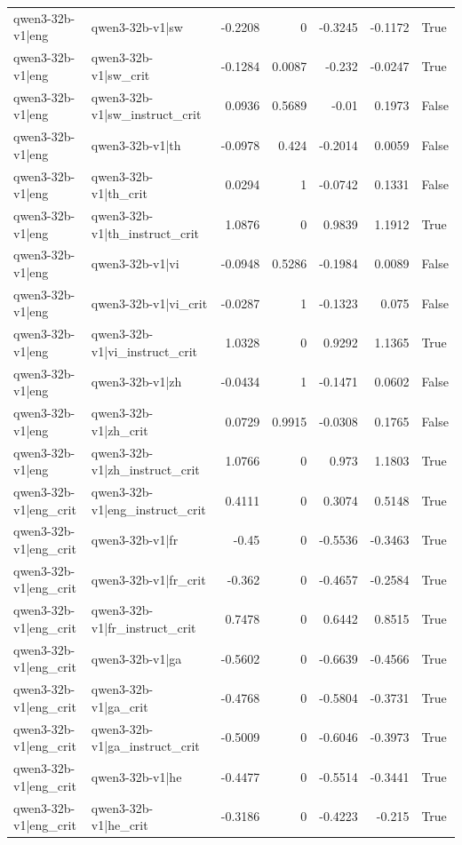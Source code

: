 \begin{table}
\begin{tabular}{l l r r r r l}
qwen3-32b-v1|eng & qwen3-32b-v1|sw & -0.2208 & 0 & -0.3245 & -0.1172 & True \\
qwen3-32b-v1|eng & qwen3-32b-v1|sw_crit & -0.1284 & 0.0087 & -0.232 & -0.0247 & True \\
qwen3-32b-v1|eng & qwen3-32b-v1|sw_instruct_crit & 0.0936 & 0.5689 & -0.01 & 0.1973 & False \\
qwen3-32b-v1|eng & qwen3-32b-v1|th & -0.0978 & 0.424 & -0.2014 & 0.0059 & False \\
qwen3-32b-v1|eng & qwen3-32b-v1|th_crit & 0.0294 & 1 & -0.0742 & 0.1331 & False \\
qwen3-32b-v1|eng & qwen3-32b-v1|th_instruct_crit & 1.0876 & 0 & 0.9839 & 1.1912 & True \\
qwen3-32b-v1|eng & qwen3-32b-v1|vi & -0.0948 & 0.5286 & -0.1984 & 0.0089 & False \\
qwen3-32b-v1|eng & qwen3-32b-v1|vi_crit & -0.0287 & 1 & -0.1323 & 0.075 & False \\
qwen3-32b-v1|eng & qwen3-32b-v1|vi_instruct_crit & 1.0328 & 0 & 0.9292 & 1.1365 & True \\
qwen3-32b-v1|eng & qwen3-32b-v1|zh & -0.0434 & 1 & -0.1471 & 0.0602 & False \\
qwen3-32b-v1|eng & qwen3-32b-v1|zh_crit & 0.0729 & 0.9915 & -0.0308 & 0.1765 & False \\
qwen3-32b-v1|eng & qwen3-32b-v1|zh_instruct_crit & 1.0766 & 0 & 0.973 & 1.1803 & True \\
qwen3-32b-v1|eng_crit & qwen3-32b-v1|eng_instruct_crit & 0.4111 & 0 & 0.3074 & 0.5148 & True \\
qwen3-32b-v1|eng_crit & qwen3-32b-v1|fr & -0.45 & 0 & -0.5536 & -0.3463 & True \\
qwen3-32b-v1|eng_crit & qwen3-32b-v1|fr_crit & -0.362 & 0 & -0.4657 & -0.2584 & True \\
qwen3-32b-v1|eng_crit & qwen3-32b-v1|fr_instruct_crit & 0.7478 & 0 & 0.6442 & 0.8515 & True \\
qwen3-32b-v1|eng_crit & qwen3-32b-v1|ga & -0.5602 & 0 & -0.6639 & -0.4566 & True \\
qwen3-32b-v1|eng_crit & qwen3-32b-v1|ga_crit & -0.4768 & 0 & -0.5804 & -0.3731 & True \\
qwen3-32b-v1|eng_crit & qwen3-32b-v1|ga_instruct_crit & -0.5009 & 0 & -0.6046 & -0.3973 & True \\
qwen3-32b-v1|eng_crit & qwen3-32b-v1|he & -0.4477 & 0 & -0.5514 & -0.3441 & True \\
qwen3-32b-v1|eng_crit & qwen3-32b-v1|he_crit & -0.3186 & 0 & -0.4223 & -0.215 & True \\

\end{tabular}
\end{table}
